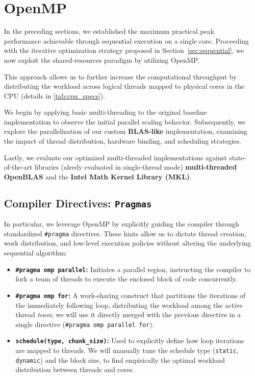 \section{OpenMP}\label{sec:openmp}

In the preceding sections, we established the maximum practical peak performance achievable through sequential execution on a single core. Proceeding with the iterative optimization strategy proposed in Section~\ref{sec:sequential}, we now exploit the shared-resources paradigm by utilizing OpenMP. 

This approach allows us to further increase the computational throughput by distributing the workload across logical threads mapped to physical cores in the CPU (details in  \ref{tab:cpu_specs}).

We begin by applying basic multi-threading to the original baseline implementation to observe the initial parallel scaling behavior. Subsequently, we explore the parallelization of our custom \textbf{BLAS-like} implementation, examining the impact of thread distribution, hardware binding, and scheduling strategies. 

Lastly, we evaluate our optimized multi-threaded implementations against state-of-the-art libraries (alredy evaluated in single-thread mode) \textbf{multi-threaded OpenBLAS} and the \textbf{Intel Math Kernel Library (MKL)}.

\subsection {Compiler Directives: \texttt{Pragmas}} 
In particular, we leverage OpenMP by explicitly guiding the compiler through standardized \texttt{\#pragma} directives. These hints allow us to dictate thread creation, work distribution, and low-level execution policies without altering the underlying sequential algorithm:

\begin{itemize}
    \item \textbf{\texttt{\#pragma omp parallel}:} Initiates a parallel region, instructing the compiler to fork a team of threads to execute the enclosed block of code concurrently.
    
    \item \textbf{\texttt{\#pragma omp for}:} A work-sharing construct that partitions the iterations of the immediately following loop, distributing the workload among the active thread \emph{team}; we will use it directly merged 
    with the previous directive in a single directive (\texttt{\#pragma omp parallel for}).
    
    \item \textbf{\texttt{schedule(type, chunk\_size)}:} Used to explicitly define how loop iterations are mapped to threads. We will manually tune the schedule type (\texttt{static}, \texttt{dynamic}) and the block size, to find empirically the optimal workload distribution between threads and cores.
\end{itemize}

